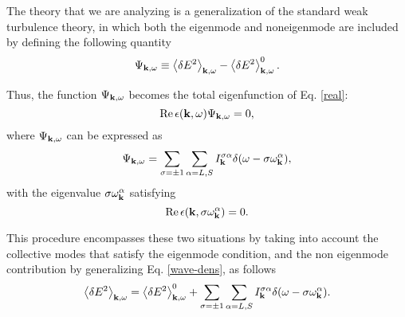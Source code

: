 \documentclass[12pt,a4paper,ruledheader]{report}
\begin{document}
The theory that we are 
analyzing is a generalization of the standard weak
turbulence theory, in which both the eigenmode and noneigenmode are
included by defining the following quantity
\begin{equation}
  \label{Psi}
  \Psi_{{\bf k},\omega}\equiv\left< \delta E^2 \right>_{{\bf k},\omega}
  -\left< \delta E^2 \right>_{{\bf k},\omega}^0.
\end{equation}

Thus, the function $\Psi_{{\bf k},\omega}$ becomes the total eigenfunction
of Eq. \eqref{real}:
\begin{equation}
  \label{total}
  \mbox{Re}\, \epsilon({\bf k},\omega)\Psi_{{\bf k}, \omega}=0,
\end{equation}
where $\Psi_{{\bf k},\omega}$ can be expressed as
\begin{equation}
  \label{Psi-eigen}
  \Psi_{{\bf k},\omega}=\sum_{\sigma=\pm 1}\sum_{\alpha=L,S}
  I_{\bf k}^{\sigma \alpha}\delta(\omega-\sigma \omega_{\bf k}^\alpha),
\end{equation}
with the eigenvalue $\sigma \omega_{\bf k}^\alpha$ satisfying
\begin{equation}
  \mbox{Re}\, \epsilon({\bf k},\sigma\omega_{\bf k}^\alpha)=0.
\end{equation}

This procedure encompasses these two situations by taking into account
the collective modes that satisfy the eigenmode condition, and the
non eigenmode contribution by generalizing Eq. \eqref{wave-dens},
as follows
\begin{equation}
  \label{gen-dens}
  \left< \delta E^2 \right>_{{\bf k},\omega}
  =\left< \delta E^2 \right>_{{\bf k},\omega}^0
  +\sum_{\sigma=\pm 1}\sum_{\alpha=L,S}
  I_{\bf k}^{\sigma \alpha}\delta(\omega-\sigma \omega_{\bf k}^\alpha).
\end{equation}
\end{document}
